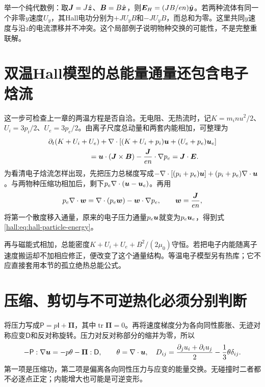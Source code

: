 举一个纯代数例：取$\bm{J}=J\hat{\bm{z}}$、$\bm{B}=B\hat{\bm{x}}$，则$\bm{E}_H=(JB/en)\hat{\bm{y}}$。若两种流体有同一个非零$y$速度$U_y$，其Hall电功分别为$+JU_yB$和$-JU_yB$，而总和为零。这里共同$y$速度与沿$z$的电流漂移并不冲突。这个局部例子说明物种交换的可能性，不是完整重联解。

\section{双温Hall模型的总能量通量还包含电子焓流}
这一步可检查上一章的两温方程是否自洽。无电阻、无热流时，记$K=m_inu^2/2$、$U_i=3p_i/2$、$U_e=3p_e/2$。由离子尺度总动量和两套内能相加，可整理为
\begin{align}
&\partial_t(K+U_i+U_e)
+\nabla\cdot[(K+U_i+p_i)\vct u+(U_e+p_e)\vct u_e]\nonumber\\
&\hspace{20mm}=\vct u\cdot(\J\times\B)-\frac{\J}{en}\cdot\nabla p_e
=\J\cdot\E.
\label{hall:eq:hall-particle-energy}
\end{align}
为看清电子焓流怎样出现，先把压力总梯度写成$-\nabla\cdot[(p_i+p_e)\bm{u}]+(p_i+p_e)\nabla\cdot\bm{u}$。与两物种压缩功相加后，剩下$p_e\nabla\cdot(\bm{u}-\bm{u}_e)$。再用
\begin{equation}
p_e\nabla\cdot\bm{w}=\nabla\cdot(p_e\bm{w})-\bm{w}\cdot\nabla p_e,
\qquad\bm{w}=\frac{\bm{J}}{en},
\end{equation}
将第一个散度移入通量，原来的电子压力通量$p_e\bm{u}$就变为$p_e\bm{u}_e$，得到式\eqref{hall:eq:hall-particle-energy}。

再与磁能式相加，总能密度$K+U_i+U_e+B^2/(2\mu_0)$守恒。若把电子内能随离子速度搬运却不加相应修正，便改变了这个通量结构。等温电子模型另有热库；它不应直接套用本节的孤立绝热总能公式。

\section{压缩、剪切与不可逆热化必须分别判断}
将压力写成$\mathsf P=p\mathsf I+\boldsymbol{\Pi}$，其中$\operatorname{tr}\boldsymbol{\Pi}=0$。再将速度梯度分为各向同性膨胀、无迹对称应变$\mathsf D$和反对称旋转。压力对反对称部分的缩并为零，所以
\begin{equation}
-\mathsf P:\nabla\bm{u}=-p\theta-\boldsymbol{\Pi}:\mathsf D,
\qquad\theta=\nabla\cdot\bm{u},
\quad D_{ij}=\frac{\partial_ju_i+\partial_iu_j}{2}-\frac13\theta\delta_{ij}.
\end{equation}
第一项是压缩功，第二项是偏离各向同性压力与应变的能量交换。无碰撞时二者都不必逐点正定；内能增大也可能是可逆变形。

